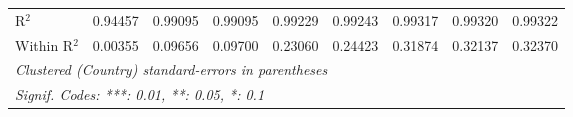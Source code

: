 \begin{table}[htbp]
\begin{tabular}{lcccccccc}
      R$^2$                                                                              & 0.94457  & 0.99095  & 0.99095  & 0.99229      & 0.99243       & 0.99317       & 0.99320       & 0.99322\\  
      Within R$^2$                                                                       & 0.00355  & 0.09656  & 0.09700  & 0.23060      & 0.24423       & 0.31874       & 0.32137       & 0.32370\\  
      \midrule \midrule
      \multicolumn{9}{l}{\emph{Clustered (Country) standard-errors in parentheses}}\\
      \multicolumn{9}{l}{\emph{Signif. Codes: ***: 0.01, **: 0.05, *: 0.1}}\\
   \end{tabular}
\end{table}


